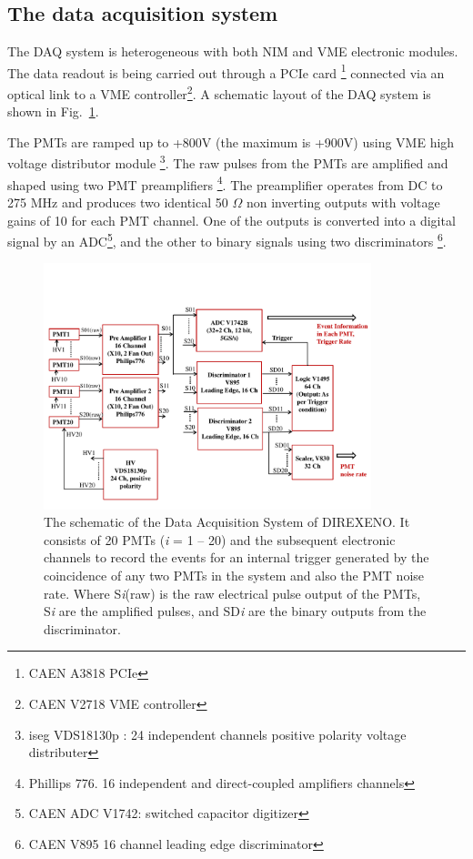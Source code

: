 \subsection{The data acquisition system }
\label{sec:DAQ}


The DAQ system is heterogeneous with both 
NIM and VME electronic modules. The data readout is being carried out through a PCIe card \footnote{CAEN A3818 PCIe}  connected via an optical link to a VME controller\footnote{CAEN V2718 VME controller}. A schematic layout of the DAQ system is shown in Fig.~{\ref{Fig:DAQscheme}}. 


The PMTs are ramped up to +800V (the maximum is +900V) using VME high voltage distributor module \footnote{iseg VDS18130p : 24 independent channels positive polarity voltage distributer}. The raw pulses from the PMTs are amplified and shaped using two PMT preamplifiers \footnote{Phillips 776. 16 independent and direct-coupled amplifiers channels}. The preamplifier operates from DC to 275 MHz and produces two identical 50 $\Omega$ non inverting outputs with voltage gains of 10 for each PMT channel. One of the outputs is converted into a digital signal by an ADC\footnote{CAEN ADC V1742: switched capacitor digitizer}, and the other to binary signals using two discriminators \footnote{CAEN V895 16 channel leading edge discriminator}.

\begin{figure}[h]
   \centering
   \includegraphics[width=0.85\textwidth]{DAQscheme.pdf}
   \caption{The schematic of the Data Acquisition System of DIREXENO. It 
        consists of 20 PMTs ({\it i} = 1 -- 20) and the subsequent electronic channels to record 
        the events for an internal trigger generated by the coincidence of any 
        two PMTs in the system and also the PMT noise rate. Where S{\it i}(raw) is the raw electrical pulse output of the PMTs, S{\it i} are the amplified pulses, and SD{\it i} are the binary outputs from the discriminator. 
}
   \label{Fig:DAQscheme}
\end{figure}

